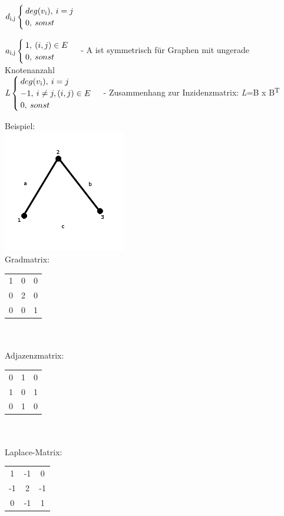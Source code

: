 $d\textsubscript{i,j}\begin{cases}deg(v\textsubscript{i}),\>i=j\\0,\>sonst\end{cases}$\newline\newline

$a\textsubscript{i,j}\begin{cases}1,\>(i,j)\in E\\0,\>sonst\end{cases}$\newline\newline
- A ist symmetrisch für Graphen mit ungerade Knotenanzahl\\

$\textit{L}\begin{cases}deg(v\textsubscript{i}),\>i=j\\-1,\>i\neq j, (i,j) \in E \\0,\>sonst\end{cases}$\newline\newline
- Zusammenhang zur Inzidenzmatrix: \textit{L}=B x B\textsuperscript{T}\newline\newline

Beispiel:\\
\includegraphics[width=0.4\textwidth]{lectures/161028/pix/dreieck.png}\\
Gradmatrix:\begin{tabular}{ccc}
1 & 0 & 0 \\
0 & 2 & 0 \\
0 & 0 & 1 \\
\end{tabular}
\\\\
Adjazenzmatrix:\begin{tabular}{ccc}
0 & 1 & 0 \\
1 & 0 & 1 \\
0 & 1 & 0 \\
\end{tabular}
\\\\
Laplace-Matrix:\begin{tabular}{ccc}
1 & -1 & 0 \\
-1 & 2 & -1 \\
0 & -1 & 1 \\
\end{tabular}

